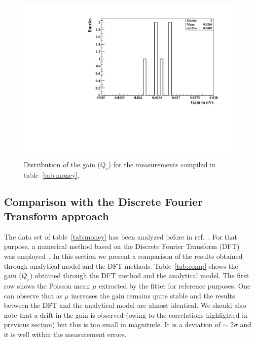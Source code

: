 \documentclass[preprint,12pt]{elsarticle}
\begin{document}
\begin{figure}[!t]
\centering
\includegraphics[width=12.25cm, height=8.5cm]{figures/Qs.pdf} 
\caption{Distribution of the gain ($Q_s$) for the measurements compiled in table~\ref{tab:money}. }
\label{fig:g}
\end{figure}

\subsection{Comparison with the Discrete Fourier Transform approach}

The data set of table~\ref{tab:money} has been analyzed before in ref.~\cite{me2}. 
For that purpose, a numerical method based on the Discrete Fourier Transform (DFT) was employed~\cite{me}. 
In this section we present a comparison of the results obtained through analytical model and the DFT methods. 
 Table~\ref{tab:comp} shows the gain ($Q_s$) obtained through the DFT method and the analytical model. 
The first row shows the Poisson mean $\mu$ extracted by the fitter for reference purposes. 
One can observe that as $\mu$ increases the gain remains quite stable and the results between the DFT and the analytical model are almost identical. 
We should also note that a drift in the gain is observed (owing to the correlations highlighted in previous section) but this is too small in magnitude.
It is a deviation of $\sim$ 2$\sigma$ and it is well within the measurement errors.    
\end{document}
